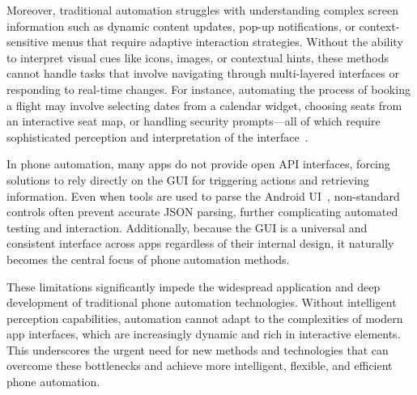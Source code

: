 Moreover, traditional automation struggles with understanding complex screen information such as dynamic content updates, pop-up notifications, or context-sensitive menus that require adaptive interaction strategies. Without the ability to interpret visual cues like icons, images, or contextual hints, these methods cannot handle tasks that involve navigating through multi-layered interfaces or responding to real-time changes. For instance, automating the process of booking a flight may involve selecting dates from a calendar widget, choosing seats from an interactive seat map, or handling security prompts—all of which require sophisticated perception and interpretation of the interface~\cite{zhang2024llamatouch}.

In phone automation, many apps do not provide open API interfaces, forcing solutions to rely directly on the GUI for triggering actions and retrieving information. Even when tools are used to parse the Android UI~\cite{wu2021screen}, non-standard controls often prevent accurate JSON parsing, further complicating automated testing and interaction. Additionally, because the GUI is a universal and consistent interface across apps regardless of their internal design, it naturally becomes the central focus of phone automation methods.

These limitations significantly impede the widespread application and deep development of traditional phone automation technologies. Without intelligent perception capabilities, automation cannot adapt to the complexities of modern app interfaces, which are increasingly dynamic and rich in interactive elements. This underscores the urgent need for new methods and technologies that can overcome these bottlenecks and achieve more intelligent, flexible, and efficient phone automation.


